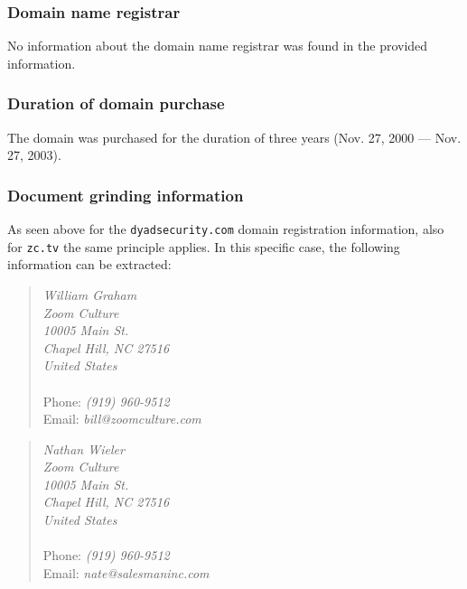 \subsubsection{Domain name registrar}

No information about the domain name registrar was found in the provided information.

\subsubsection{Duration of domain purchase}

The domain was purchased for the duration of three years (Nov. 27, 2000 --- Nov. 27, 2003).

\subsubsection{Document grinding information}

As seen above for the {\tt dyadsecurity.com} domain registration information, also for {\tt zc.tv} the same principle applies. In this specific case, the following information can be extracted:

\begin{minipage}[t]{0.5\textwidth}
	\begin{quote}
		\textit{%
			William Graham\\
			Zoom Culture\\
			10005 Main St.\\
			Chapel Hill, NC 27516\\
			United States
		}\\
		\\
		Phone: \textit{(919) 960-9512}\\
		Email: \textit{bill@zoomculture.com}
	\end{quote}
\end{minipage}
\begin{minipage}[t]{0.5\textwidth}
	\begin{quote}
		\textit{%
			Nathan Wieler\\
			Zoom Culture\\
			10005 Main St.\\
			Chapel Hill, NC 27516\\
			United States
		}\\
		\\
		Phone: \textit{(919) 960-9512}\\
		Email: \textit{nate@salesmaninc.com}
	\end{quote}
\end{minipage}
